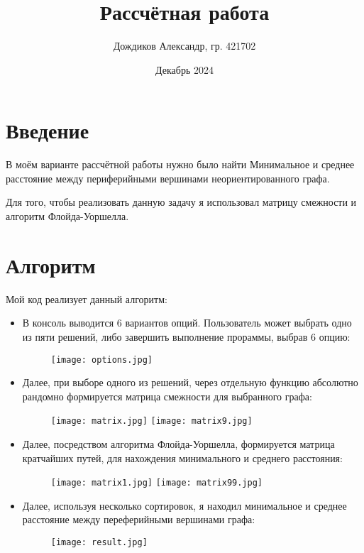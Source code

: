 \documentclass[14 pt]{article}
\title{Рассчётная работа}
\author{Дождиков Александр, гр. 421702}
\date{Декабрь 2024}
\begin{document}
\large
\maketitle
\newpage

\section{Введение}
\begin{введение}
В моём варианте рассчётной работы нужно было найти Минимальное и среднее расстояние между периферийными вершинами неориентированного графа.

Для того, чтобы реализовать данную задачу я использовал матрицу смежности и алгоритм Флойда-Уоршелла.
\end{введение}

\section{Алгоритм}
\begin{алгоритм}
Мой код реализует данный алгоритм:
\begin{itemize}
    \item В консоль выводится 6 вариантов опций. Пользователь может выбрать одно из пяти решений, либо завершить выполнение прораммы, выбрав 6 опцию:
    \begin{figure}[H]
    \texttt{[image: options.jpg]}
    \centering
    \end{figure}
    \item Далее, при выборе одного из решений, через отдельную функцию абсолютно рандомно формируется матрица смежности для выбранного графа:
    \begin{figure}[H]
    \texttt{[image: matrix.jpg]}
    \texttt{[image: matrix9.jpg]}
    \centering
    \end{figure}
    \newpage
    \item Далее, посредством алгоритма Флойда-Уоршелла, формируется матрица кратчайших путей, для нахождения минимального и среднего расстояния:
    \begin{figure}[H]
    \texttt{[image: matrix1.jpg]}
    \texttt{[image: matrix99.jpg]}
    \centering
    \end{figure}
    \item Далее, используя несколько сортировок, я находил минимальное и среднее расстояние между переферийными вершинами графа:
    \begin{figure}[H]
    \texttt{[image: result.jpg]}
    \centering
    \end{figure}
\end{itemize}
\end{алгоритм}
\end{document}
